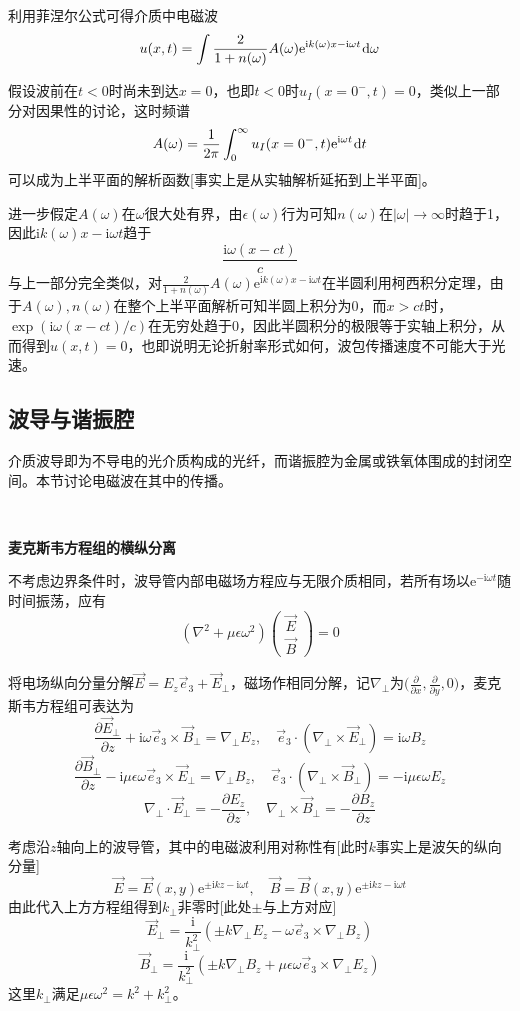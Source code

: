 \documentclass[a4paper,UTF8,fontset=windows]{ctexart}
\newcommand*{\dr}{\hspace{0.07em}\mathrm{d}}
\newcommand*{\er}{\mathrm{e}}
\newcommand*{\ir}{\mathrm{i}}
\newcommand*{\vb}{\vec{B}}
\newcommand*{\ve}{\vec{E}}
\newcommand*{\ves}{\vec{e}}
\newcommand*{\pt}[2][t]{\frac{\partial #2}{\partial #1}}
\begin{document}
利用菲涅尔公式可得介质中电磁波
$$u(x,t)=\int\frac{2}{1+n(\omega)}A(\omega)\er^{\ir k(\omega)x-\ir\omega t}\dr\omega$$

假设波前在$t<0$时尚未到达$x=0$，也即$t<0$时$u_I(x=0^-,t)=0$，类似上一部分对因果性的讨论，这时频谱
$$A(\omega)=\frac{1}{2\pi}\int_0^\infty u_I(x=0^-,t)\er^{\ir\omega t}\dr t$$
可以成为上半平面的解析函数[事实上是从实轴解析延拓到上半平面]。

进一步假定$A(\omega)$在$\omega$很大处有界，由$\epsilon(\omega)$行为可知$n(\omega)$在$|\omega|\to\infty$时趋于1，因此$\ir k(\omega)x-\ir\omega t$趋于
$$\frac{\ir\omega(x-ct)}{c}$$
与上一部分完全类似，对$\frac{2}{1+n(\omega)}A(\omega)\er^{\ir k(\omega)x-\ir\omega t}$在半圆利用柯西积分定理，由于$A(\omega),n(\omega)$在整个上半平面解析可知半圆上积分为0，而$x>ct$时，$\exp(\ir\omega(x-ct)/c)$在无穷处趋于0，因此半圆积分的极限等于实轴上积分，从而得到$u(x,t)=0$，也即说明无论折射率形式如何，波包传播速度不可能大于光速。

\subsection{波导与谐振腔}
介质波导即为不导电的光介质构成的光纤，而谐振腔为金属或铁氧体围成的封闭空间。本节讨论电磁波在其中的传播。

\

\textbf{麦克斯韦方程组的横纵分离}

不考虑边界条件时，波导管内部电磁场方程应与无限介质相同，若所有场以$\er^{-\ir\omega t}$随时间振荡，应有
$$(\nabla^2+\mu\epsilon\omega^2)\begin{pmatrix}\ve\\\vb\end{pmatrix}=0$$

将电场纵向分量分解$\ve=E_z\ves_3+\ve_\bot$，磁场作相同分解，记$\nabla_\bot$为$\big(\pt[x]{},\pt[y]{},0\big)$，麦克斯韦方程组可表达为
$$\pt[z]{\ve_\bot}+\ir\omega\ves_3\times\vb_\bot=\nabla_\bot E_z,\quad\ves_3\cdot(\nabla_\bot\times\ve_\bot)=\ir\omega B_z$$
$$\pt[z]{\vb_\bot}-\ir\mu\epsilon\omega\ves_3\times\ve_\bot=\nabla_\bot B_z,\quad\ves_3\cdot(\nabla_\bot\times\vb_\bot)=-\ir\mu\epsilon\omega E_z$$
$$\nabla_\bot\cdot\ve_\bot=-\pt[z]{E_z},\quad\nabla_\bot\times\vb_\bot=-\pt[z]{B_z}$$

考虑沿$z$轴向上的波导管，其中的电磁波利用对称性有[此时$k$事实上是波矢的纵向分量]
$$\ve=\ve(x,y)\er^{\pm\ir kz-\ir\omega t},\quad\vb=\vb(x,y)\er^{\pm\ir kz-\ir\omega t}$$
由此代入上方方程组得到$k_\bot$非零时[此处$\pm$与上方对应]
$$\ve_\bot=\frac{\ir}{k_\bot^2}(\pm k\nabla_\bot E_z-\omega\ves_3\times\nabla_\bot B_z)$$
$$\vb_\bot=\frac{\ir}{k_\bot^2}(\pm k\nabla_\bot B_z+\mu\epsilon\omega\ves_3\times\nabla_\bot E_z)$$
这里$k_\bot$满足$\mu\epsilon\omega^2=k^2+k_\bot^2$。
\end{document}
